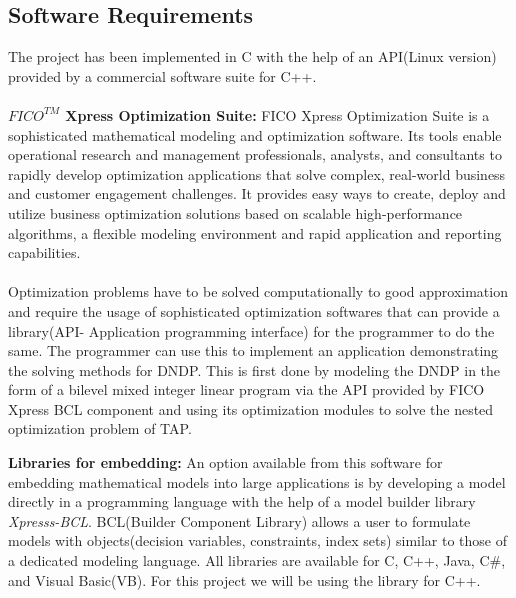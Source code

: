 \documentclass[a4paper, 12pt]{article}
\begin{document}
\subsection{Software Requirements}
The project has been implemented in C with the help of an API(Linux version) provided by a commercial software suite for C++.\\~\\
\textbf{\boldmath$FICO^{TM}$ Xpress Optimization Suite:}   FICO Xpress Optimization Suite is a sophisticated mathematical modeling and optimization software. Its tools enable operational research and management professionals, analysts, and consultants to rapidly develop optimization applications that solve complex, real-world business and customer engagement challenges. It provides easy ways to create, deploy and utilize business optimization solutions based on scalable high-performance algorithms, a flexible modeling environment and rapid application and reporting capabilities.\\~\\
Optimization problems have to be solved computationally to good approximation and require the usage of sophisticated optimization 
softwares that can provide a library(API- Application programming interface) for the programmer to do the same. The programmer can use this to
 implement an application demonstrating the solving methods for DNDP. This is first done by modeling the DNDP in the form of a bilevel mixed 
integer linear program via the API provided by FICO Xpress BCL component and using its optimization modules to solve the nested optimization 
problem of TAP.\par                   
\noindent
\textbf{Libraries for embedding:}   An option available from this software for embedding mathematical models into large applications is by developing a model directly in a programming language with the help of a model builder library \textit{Xpresss-BCL}. BCL(Builder Component Library) allows a user to formulate models with objects(decision variables, constraints, index sets) similar to those of a dedicated modeling language. All libraries are available for C, C++, Java, C\#, and Visual Basic(VB). For this project we will be using the library for C++.\\ \par
\end{document}
